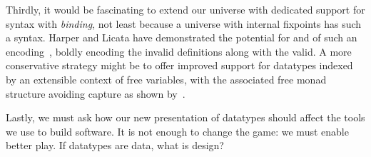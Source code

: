 Thirdly, it would be fascinating to extend our universe with dedicated
support for syntax with \emph{binding}, not least because a universe
with internal fixpoints has such a syntax. Harper and Licata have
demonstrated the potential for and of such an
encoding~\citep{DBLP:conf/icfp/LicataH09}, boldly encoding the invalid
definitions along with the valid. A more conservative strategy might
be to offer improved support for datatypes indexed by an extensible
context of free variables, with the associated free monad structure
avoiding capture as shown by~\citet{altenkirch:monadic-lambda}.

Lastly, we must ask how our new presentation of datatypes
should affect the tools we use to build software. It is not enough to
change the game: we must enable better play. If datatypes are data,
what is design?

